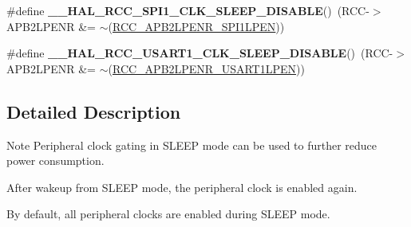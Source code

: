 \begin{DoxyCompactItemize}
\item 
\hypertarget{group___r_c_c___peripheral___clock___sleep___enable___disable_ga2abe90eeb15890f45e28e8926bf70838}{\#define {\bfseries \-\_\-\-\_\-\-H\-A\-L\-\_\-\-R\-C\-C\-\_\-\-S\-P\-I1\-\_\-\-C\-L\-K\-\_\-\-S\-L\-E\-E\-P\-\_\-\-D\-I\-S\-A\-B\-L\-E}()~(R\-C\-C-\/$>$A\-P\-B2\-L\-P\-E\-N\-R \&= $\sim$(\hyperlink{group___peripheral___registers___bits___definition_ga2c6729058e54f4b8f8ae01d5b3586aaa}{R\-C\-C\-\_\-\-A\-P\-B2\-L\-P\-E\-N\-R\-\_\-\-S\-P\-I1\-L\-P\-E\-N}))}\label{group___r_c_c___peripheral___clock___sleep___enable___disable_ga2abe90eeb15890f45e28e8926bf70838}

\item 
\hypertarget{group___r_c_c___peripheral___clock___sleep___enable___disable_ga75ec6abe2e15eaa24893a8cc83f4cb50}{\#define {\bfseries \-\_\-\-\_\-\-H\-A\-L\-\_\-\-R\-C\-C\-\_\-\-U\-S\-A\-R\-T1\-\_\-\-C\-L\-K\-\_\-\-S\-L\-E\-E\-P\-\_\-\-D\-I\-S\-A\-B\-L\-E}()~(R\-C\-C-\/$>$A\-P\-B2\-L\-P\-E\-N\-R \&= $\sim$(\hyperlink{group___peripheral___registers___bits___definition_gab8b429bc8d52abd1ba3818a82542bb98}{R\-C\-C\-\_\-\-A\-P\-B2\-L\-P\-E\-N\-R\-\_\-\-U\-S\-A\-R\-T1\-L\-P\-E\-N}))}\label{group___r_c_c___peripheral___clock___sleep___enable___disable_ga75ec6abe2e15eaa24893a8cc83f4cb50}

\end{DoxyCompactItemize}


\subsection{Detailed Description}
\begin{DoxyNote}{Note}
Peripheral clock gating in S\-L\-E\-E\-P mode can be used to further reduce power consumption. 

After wakeup from S\-L\-E\-E\-P mode, the peripheral clock is enabled again. 

By default, all peripheral clocks are enabled during S\-L\-E\-E\-P mode. 
\end{DoxyNote}


